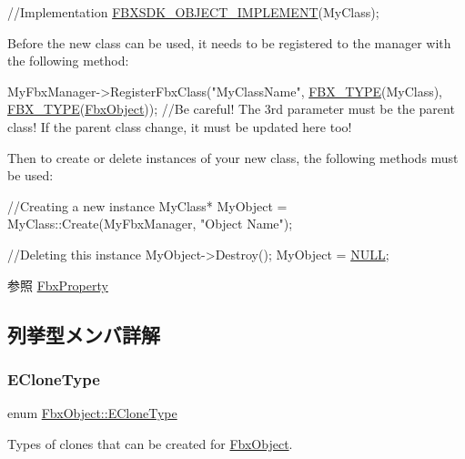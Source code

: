 \begin{DoxyCode}
\textcolor{comment}{//Implementation}
\hyperlink{fbxobject_8h_ac76185d8d380cda2e3d5c10981e5f510}{FBXSDK\_OBJECT\_IMPLEMENT}(MyClass);
\end{DoxyCode}
 Before the new class can be used, it needs to be registered to the manager with the following method\+: 
\begin{DoxyCode}
MyFbxManager->RegisterFbxClass(\textcolor{stringliteral}{"MyClassName"}, \hyperlink{fbxobject_8h_a5d7afc748adbd02b6e42e01ec252f29e}{FBX\_TYPE}(MyClass), 
      \hyperlink{fbxobject_8h_a5d7afc748adbd02b6e42e01ec252f29e}{FBX\_TYPE}(\hyperlink{class_fbx_object}{FbxObject}));  \textcolor{comment}{//Be careful! The 3rd parameter must be the parent class! If the
       parent class change, it must be updated here too!}
\end{DoxyCode}
 Then to create or delete instances of your new class, the following methods must be used\+: 
\begin{DoxyCode}
\textcolor{comment}{//Creating a new instance}
MyClass* MyObject = MyClass::Create(MyFbxManager, \textcolor{stringliteral}{"Object Name"});

\textcolor{comment}{//Deleting this instance}
MyObject->Destroy();
MyObject = \hyperlink{fbxarch_8h_a070d2ce7b6bb7e5c05602aa8c308d0c4}{NULL};
\end{DoxyCode}
 \begin{DoxySeeAlso}{参照}
\hyperlink{class_fbx_property}{Fbx\+Property} 
\end{DoxySeeAlso}


\subsection{列挙型メンバ詳解}
\mbox{\label{class_fbx_object_a9f5626b2d2135684d6ea1e6e4ad2acbb}} 
\subsubsection{\texorpdfstring{E\+Clone\+Type}{ECloneType}}
{\footnotesize\ttfamily enum \hyperlink{class_fbx_object_a9f5626b2d2135684d6ea1e6e4ad2acbb}{Fbx\+Object\+::\+E\+Clone\+Type}}



Types of clones that can be created for \hyperlink{class_fbx_object}{Fbx\+Object}. 

